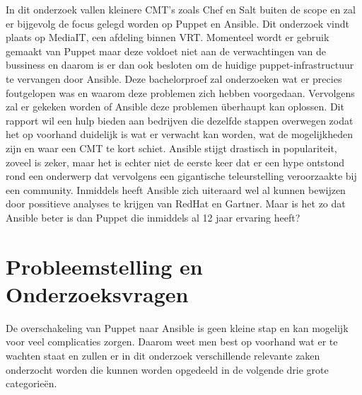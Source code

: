 In dit onderzoek vallen kleinere CMT's zoals Chef en Salt buiten de scope en zal er bijgevolg de focus gelegd worden op Puppet en Ansible. Dit onderzoek vindt plaats op MediaIT, een afdeling binnen VRT. Momenteel wordt er gebruik gemaakt van Puppet maar deze voldoet niet aan de verwachtingen van de bussiness en daarom is er dan ook besloten om de huidige puppet-infrastructuur te vervangen door Ansible.
Deze bachelorproef zal onderzoeken wat er precies foutgelopen was en waarom deze problemen zich hebben voorgedaan. Vervolgens zal er gekeken worden of Ansible deze problemen \"uberhaupt kan oplossen. Dit rapport wil een hulp bieden aan bedrijven die dezelfde stappen overwegen zodat het op voorhand duidelijk is wat er verwacht kan worden, wat de mogelijkheden zijn en waar een CMT te kort schiet. Ansible stijgt drastisch in populariteit, zoveel is zeker, maar het is echter niet de eerste keer dat er een hype ontstond rond een onderwerp dat vervolgens een gigantische teleurstelling veroorzaakte bij een community. Inmiddels heeft Ansible zich uiteraard wel al kunnen bewijzen door possitieve analyses te krijgen van RedHat en Gartner. Maar is het zo dat Ansible beter is dan Puppet die inmiddels al 12 jaar ervaring heeft?




\section{Probleemstelling en Onderzoeksvragen}
\label{sec:onderzoeksvragen}




De overschakeling van Puppet naar Ansible is geen kleine stap en kan mogelijk voor veel complicaties zorgen. Daarom weet men best op voorhand wat er te wachten staat en zullen er in dit onderzoek verschillende relevante zaken onderzocht worden die kunnen worden opgedeeld in de volgende drie grote categorie\"en. 


